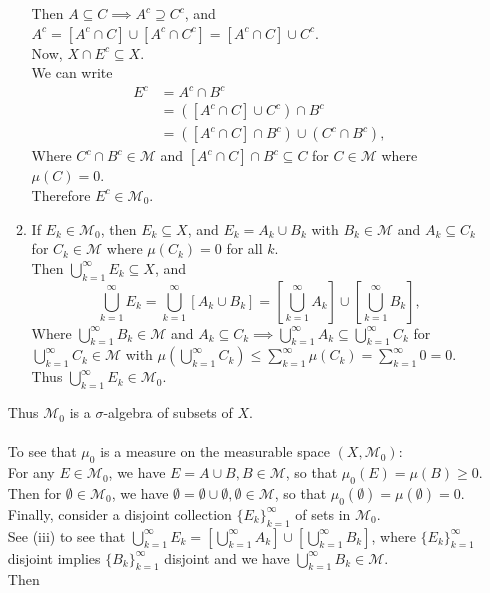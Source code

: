 \begin{enumerate}
\begin{enumerate}[label=(\roman*),align=left]
		Then $A\subseteq C\implies A^c\supseteq C^c$, and $A^c=[A^c\cap C]\cup[A^c\cap C^c]=[A^c\cap C]\cup C^c$.
		\\Now, $X\cap E^c\subseteq X$.
		\\We can write
		\begin{align*}
			E^c&=A^c\cap B^c\\
			&=([A^c\cap C]\cup C^c)\cap B^c\\
			&=([A^c\cap C]\cap B^c)\cup (C^c\cap B^c),
		\end{align*}
		Where $C^c\cap B^c\in\mathcal{M}$ and $[A^c\cap C]\cap B^c\subseteq C$ for $C\in\mathcal{M}$ where $\mu(C)=0$.
		\\Therefore $E^c\in\mathcal{M}_0$.
		\item If $E_k\in\mathcal{M}_0$, then $E_k\subseteq X$, and $E_k=A_k\cup B_k$ with $B_k\in\mathcal{M}$ and $A_k\subseteq C_k$ for $C_k\in\mathcal{M}$ where $\mu(C_k)=0$ for all $k$.\\
		Then $\bigcup_{k=1}^\infty E_k\subseteq X$, and 
		\[
			\bigcup_{k=1}^\infty E_k=\bigcup_{k=1}^\infty [A_k\cup B_k]=[\bigcup_{k=1}^\infty A_k]\cup[\bigcup_{k=1}^\infty B_k],
		\]
		Where $\bigcup_{k=1}^\infty B_k\in\mathcal{M}$ and $A_k\subseteq C_k\implies\bigcup_{k=1}^\infty A_k\subseteq \bigcup_{k=1}^\infty C_k$ for $\bigcup_{k=1}^\infty C_k\in\mathcal{M}$ with $\mu(\bigcup_{k=1}^\infty C_k)\le\sum_{k=1}^\infty\mu(C_k)=\sum_{k=1}^\infty0=0$.
		\\Thus $\bigcup_{k=1}^\infty E_k\in\mathcal{M}_0$.
	\end{enumerate}
	Thus $\mathcal{M}_0$ is a $\sigma$-algebra of subsets of $X$.\\
	\\To see that $\mu_0$ is a measure on the measurable space $(X,\mathcal{M}_0)$:
	\\For any $E\in\mathcal{M}_0$, we have $E=A\cup B,B\in\mathcal{M}$, so that $\mu_0(E)=\mu(B)\ge0$.
	\\Then for $\emptyset\in\mathcal{M}_0$, we have $\emptyset=\emptyset\cup \emptyset,\emptyset\in\mathcal{M}$, so that $\mu_0(\emptyset)=\mu(\emptyset)=0$.
	\\Finally, consider a disjoint collection $\{E_k\}_{k=1}^\infty$ of sets in $\mathcal{M}_0$.
	\\See (iii) to see that $\bigcup_{k=1}^\infty E_k=[\bigcup_{k=1}^\infty A_k]\cup[\bigcup_{k=1}^\infty B_k]$, where $\{E_k\}_{k=1}^\infty$ disjoint implies $\{B_k\}_{k=1}^\infty$ disjoint and we have $\bigcup_{k=1}^\infty B_k\in\mathcal{M}$.
	\\Then 

\end{enumerate}
